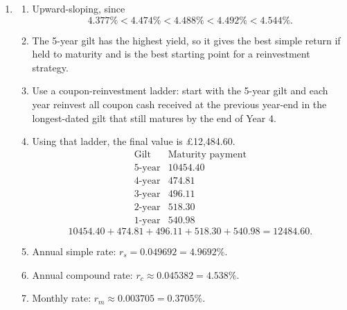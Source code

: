 \documentclass[12pt]{article}
\begin{document}
\begin{enumerate}[label=\textbf{Q\arabic*.}]
\begin{enumerate}[label=(\alph*), start=3]
\item Compounding can be achieved by reinvesting every coupon payment and maturing principal in further gilts as soon as they are received, so interest is earned on previous interest.
\end{enumerate}

\newpage

\item
\begin{enumerate}[label=(\alph*)]
\item Upward-sloping, since \[
4.377\%<4.474\%<4.488\%<4.492\%<4.544\%.
\]
\item The 5-year gilt has the highest yield, so it gives the best simple return if held to maturity and is the best starting point for a reinvestment strategy.
\item Use a coupon-reinvestment ladder: start with the 5-year gilt and each year reinvest all coupon cash received at the previous year-end in the longest-dated gilt that still matures by the end of Year 4.
\item Using that ladder, the final value is \pounds 12,484.60.
\[
\begin{array}{c|c}
\text{Gilt} & \text{Maturity payment}\\ \hline
5\text{-year} & 10454.40\\
4\text{-year} & 474.81\\
3\text{-year} & 496.11\\
2\text{-year} & 518.30\\
1\text{-year} & 540.98
\end{array}
\]
\[
10454.40+474.81+496.11+518.30+540.98=12484.60.
\]
\item Annual simple rate: $r_s=0.049692=4.9692\%$.
\item Annual compound rate: $r_c\approx 0.045382=4.538\%$.
\item Monthly rate: $r_m\approx 0.003705=0.3705\%$.
\end{enumerate}

\end{enumerate}
\end{document}
